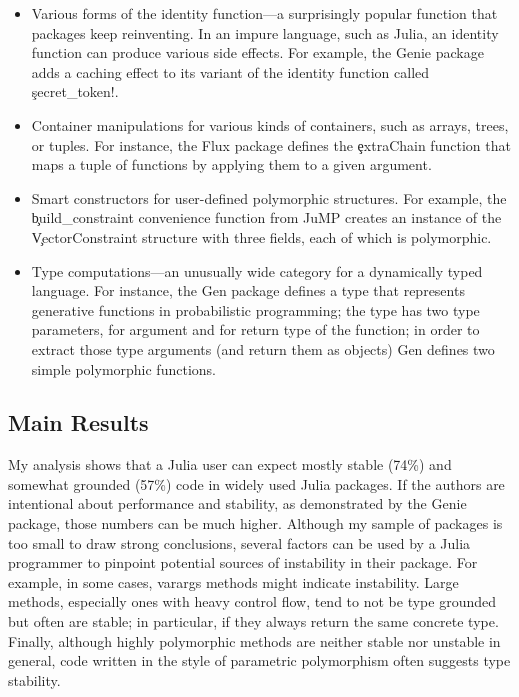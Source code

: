 \begin{itemize}
\item
  Various forms of the identity function---a surprisingly popular function that
  packages keep reinventing. In an impure language, such as Julia, an identity
  function can produce various side effects.
  For example, the Genie package adds a caching effect to
  its variant of the identity function called \c{secret_token!}.

\item Container manipulations for various kinds of containers, such as arrays,
  trees, or tuples. For instance, the Flux package defines the
  \c{extraChain} function that maps a tuple of functions by applying
  them to a given argument.

\item
  Smart constructors for user-defined polymorphic structures. For example, the
  \c{build_constraint} convenience function from JuMP creates an instance of the
  \c{VectorConstraint} structure with three fields, each of which is polymorphic.

\item
  Type computations---an unusually wide category for a dynamically typed
  language. For instance, the Gen package defines a type that represents generative
  functions in probabilistic programming; the type has two type parameters, for
  argument and for return type of the function; in order to extract those type
  arguments (and return them as objects) Gen defines two simple polymorphic functions.

\end{itemize}

\subsection{Main Results}

My analysis shows that a Julia user can expect mostly stable (74\%) and
somewhat grounded (57\%) code in widely used Julia packages. If the authors
are intentional about performance and stability, as demonstrated by the Genie
package, those numbers can be much higher. Although my sample of packages is
too small to draw strong conclusions, several factors can be
used by a Julia programmer to pinpoint potential sources of instability in their
package. For example, in some cases, varargs methods might indicate instability.
Large methods, especially ones with heavy control flow,
tend to not be type grounded but often are stable; in particular,
if they always return the same concrete type.
Finally, although highly polymorphic methods are neither stable nor unstable
in general, code written in the style of parametric polymorphism
often suggests type stability.

